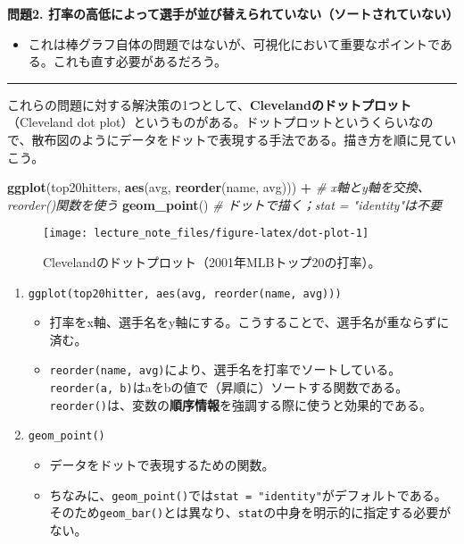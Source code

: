 \documentclass[]{book}
\newenvironment{Shaded}{\begin{snugshade}}{\end{snugshade}}
\newcommand{\KeywordTok}[1]{\textcolor[rgb]{0.13,0.29,0.53}{\textbf{#1}}}
\newcommand{\StringTok}[1]{\textcolor[rgb]{0.31,0.60,0.02}{#1}}
\newcommand{\CommentTok}[1]{\textcolor[rgb]{0.56,0.35,0.01}{\textit{#1}}}
\newcommand{\OperatorTok}[1]{\textcolor[rgb]{0.81,0.36,0.00}{\textbf{#1}}}
\newcommand{\NormalTok}[1]{#1}
\providecommand{\tightlist}{%
  \setlength{\itemsep}{0pt}\setlength{\parskip}{0pt}}
\begin{document}
\textbf{問題2.
打率の高低によって選手が並び替えられていない（ソートされていない）}

\begin{itemize}
\tightlist
\item
  これは棒グラフ自体の問題ではないが、可視化において重要なポイントである。これも直す必要があるだろう。
\end{itemize}

\begin{center}\rule{0.5\linewidth}{\linethickness}\end{center}

これらの問題に対する解決策の1つとして、\textbf{Clevelandのドットプロット}（Cleveland
dot
plot）というものがある。ドットプロットというくらいなので、散布図のようにデータをドットで表現する手法である。描き方を順に見ていこう。



\begin{Shaded}
\begin{Highlighting}[]
\KeywordTok{ggplot}\NormalTok{(top20hitters, }\KeywordTok{aes}\NormalTok{(avg, }\KeywordTok{reorder}\NormalTok{(name, avg))) }\OperatorTok{+}\StringTok{ }\CommentTok{# x軸とy軸を交換、reorder()関数を使う}
\StringTok{  }\KeywordTok{geom_point}\NormalTok{() }\CommentTok{# ドットで描く；stat = "identity"は不要}
\end{Highlighting}
\end{Shaded}

\begin{figure}

{\centering \texttt{[image: lecture\_note\_files/figure-latex/dot-plot-1]} 

}

\caption{Clevelandのドットプロット（2001年MLBトップ20の打率）。}\label{fig:dot-plot}
\end{figure}

\begin{enumerate}
\def\labelenumi{\arabic{enumi}.}
\item
  \texttt{ggplot(top20hitter,\ aes(avg,\ reorder(name,\ avg)))}

  \begin{itemize}
  \item
    打率をx軸、選手名をy軸にする。こうすることで、選手名が重ならずに済む。
  \item
    \texttt{reorder(name,\ avg)}により、選手名を打率でソートしている。\texttt{reorder(a,\ b)}はaをbの値で（昇順に）ソートする関数である。\texttt{reorder()}は、変数の\textbf{順序情報}を強調する際に使うと効果的である。
  \end{itemize}
\item
  \texttt{geom\_point()}

  \begin{itemize}
  \item
    データをドットで表現するための関数。
  \item
    ちなみに、\texttt{geom\_point()}では\texttt{stat\ =\ "identity"}がデフォルトである。そのため\texttt{geom\_bar()}とは異なり、\texttt{stat}の中身を明示的に指定する必要がない。
  \end{itemize}
\end{enumerate}
\end{document}
